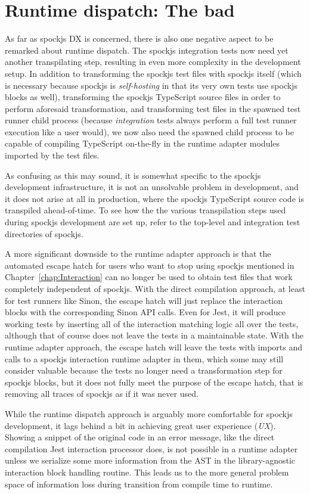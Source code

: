 \section{Runtime dispatch: The bad}
As far as spockjs DX is concerned,
there is also one negative aspect to be remarked about runtime dispatch.
The spockjs integration tests now need yet another transpilating step,
resulting in even more complexity in the development setup.
In addition to transforming the spockjs test files with spockjs itself
(which is necessary because spockjs is \textit{self-hosting}
in that its very own tests use spockjs blocks as well),
transforming the spockjs TypeScript source files
in order to perform aforesaid transformation, and
transforming test files in the spawned test runner child process
(because \textit{integration} tests always perform
a full test runner execution like a user would),
we now also need the spawned child process
to be capable of compiling TypeScript on-the-fly
in the runtime adapter modules imported by the test files.

As confusing as this may sound,
it is somewhat specific to the spockjs development infrastructure,
it is not an unsolvable problem in development, and
it does not arise at all in production,
where the spockjs TypeScript source code is transpiled ahead-of-time.
To see how the the various transpilation steps
used during spockjs development are set up,
refer to the top-level and integration test directories of spockjs.
\autocite{SpockjsGithubRuntimeDispatch}

A more significant downside to the runtime adapter approach is
that the automated escape hatch
for users who want to stop using spockjs
mentioned in Chapter~\ref{chap:Interaction}
can no longer be used to obtain test files
that work completely independent of spockjs.
With the direct compilation approach,
at least for test runners like Sinon,
the escape hatch will just
replace the interaction blocks
with the corresponding Sinon API calls.
Even for Jest, it will produce working tests
by inserting all of the interaction matching logic all over the tests,
although that of course does not
leave the tests in a maintainable state.
With the runtime adapter approach,
the escape hatch will leave the tests
with imports and calls to
a spockjs interaction runtime adapter in them,
which some may still consider valuable
because the tests no longer need
a transformation step for spockjs blocks,
but it does not fully meet
the purpose of the escape hatch,
that is removing all traces of spockjs
as if it was never used.

While the runtime dispatch approach is arguably
more comfortable for spockjs development,
it lags behind a bit in
achieving great user experience (\textit{UX}).
Showing a snippet of the original code in an error message,
like the direct compilation Jest interaction processor does,
is not possible in a runtime adapter
unless we serialize some more information from the AST
in the library-agnostic interaction block handling routine.
This leads us to the more general problem space
of information loss during transition from compile time to runtime.
